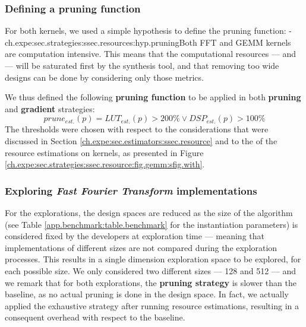         \subsubsection{Defining a pruning function}

            For both kernels, we used a simple hypothesis to define the pruning function:
            \hyp{ch.expe:sec.strategies:ssec.resources:hyp.pruning}{Both FFT and GEMM kernels are computation intensive.}
            This means that the computational resources --- \ie {} and  --- will be saturated first by the synthesis tool, and that removing too wide designs can be done by considering only those metrics.

            We thus defined the following {\bf pruning function} to be applied in both {\bf pruning} and {\bf gradient} strategies:
            \begin{equation}
                \label{ch.expe:sec.strategies:ssec.resource:eq.pruning}
                prune_{est.}(p) = LUT_{est.}(p) > 200\% \vee DSP_{est.}(p) > 100\%
            \end{equation}
            The thresholds were chosen with respect to the considerations that were discussed in Section \ref{ch.expe:sec.estimators:ssec.resource} and to the  of the resource estimations on  kernels, as presented in Figure \ref{ch.expe:sec.strategies:ssec.resource:fig.gemm:sfig.with}.

            \subsubsection{Exploring {\it Fast Fourier Transform} implementations}

                For the  explorations, the design spaces are reduced as the size of the algorithm (see Table \ref{app.benchmark:table.benchmark} for the instantiation parameters) is considered fixed by the developers at exploration time --- meaning that  implementations of different sizes are not compared during the exploration processes.
                This results in a single dimension exploration space to be explored, for each possible  size.
                We only considered two different sizes --- 128 and 512 --- and we remark that for both explorations, the {\bf pruning strategy} is slower than the baseline, as no actual pruning is done in the design space.
                In fact, we actually applied the exhaustive strategy after running resource estimations, resulting in a consequent overhead with respect to the baseline.

